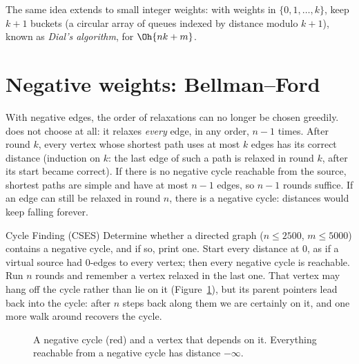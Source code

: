 
The same idea extends to small integer weights: with weights in $\{0, 1, \ldots, k\}$, keep $k + 1$ buckets (a circular array
of queues indexed by distance modulo $k + 1$), known as \emph{Dial's algorithm}, for $\Oh{n k + m}$.

\section[Negative weights: Bellman--Ford]{Negative weights: Bellman--Ford \hfill \plat}\label{sec:bellman}

With negative edges, the order of relaxations can no longer be chosen greedily.  does not choose at all:
it relaxes \emph{every} edge, in any order, $n - 1$ times. After round $k$, every vertex whose shortest path uses at most $k$
edges has its correct distance (induction on $k$: the last edge of such a path is relaxed in round $k$, after its start became
correct). If there is no negative cycle reachable from the source, shortest paths are simple and have at most $n - 1$ edges,
so $n - 1$ rounds suffice. If an edge can still be relaxed in round $n$, there is a negative cycle: distances would keep falling
forever.

\begin{problem}{Cycle Finding (CSES)}
Determine whether a directed graph ($n \le 2500$, $m \le 5000$) contains a negative cycle, and if so, print one.
\solution Start every distance at 0, as if a virtual source had 0-edges to every vertex; then every negative cycle is
reachable. Run $n$ rounds and remember a vertex relaxed in the last one. That vertex may hang off the cycle rather than lie on it
(Figure~\ref{fig:negcycle}), but its parent pointers lead back into the cycle: after $n$ steps back along them we are certainly on
it, and one more walk around recovers the cycle.
\end{problem}

\begin{figure}[htbp]
\centering
{}
\caption{A negative cycle (red) and a vertex that depends on it. Everything reachable from a negative cycle has distance
$-\infty$.}
\label{fig:negcycle}
\end{figure}

